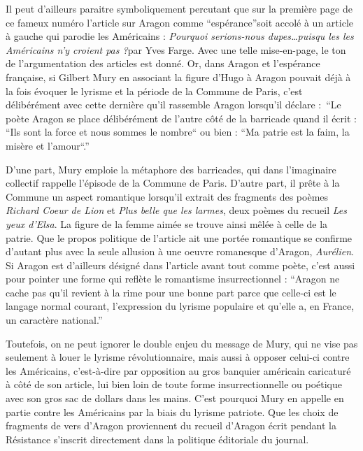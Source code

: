 Il peut d’ailleurs paraitre symboliquement percutant que sur la première page de ce fameux numéro l’article sur Aragon comme \enquote{espérance}soit accolé à un article à gauche qui parodie les Américains : \emph{Pourquoi serions-nous dupes…puisqu les les Américains n’y croient pas ?}par Yves Farge. Avec une telle mise-en-page, le ton de l’argumentation des articles est donné. Or, dans Aragon et l’espérance française, si Gilbert Mury en associant la figure d’Hugo à Aragon pouvait déjà à la fois évoquer le lyrisme et la période de la Commune de Paris, c’est délibérément avec cette dernière qu’il rassemble Aragon lorsqu’il déclare : \enquote{Le poète Aragon se place délibérément de l’autre côté de la barricade quand il écrit : “Ils sont la force et nous sommes le nombre“ ou bien : “Ma patrie est la faim, la misère et l’amour“.}


	D’une part, Mury emploie la métaphore des barricades, qui dans l’imaginaire collectif rappelle l’épisode de la Commune de Paris. D’autre part, il prête à la Commune un aspect romantique lorsqu’il extrait des fragments des poèmes \emph{Richard Coeur de Lion} et \emph{Plus belle que les larmes}, deux poèmes du recueil \emph{Les yeux d’Elsa}. La figure de la femme aimée se trouve ainsi mêlée à  celle de la patrie. Que le propos politique de l’article ait une portée romantique se confirme d’autant plus avec la seule allusion à une oeuvre romanesque d’Aragon, \emph{Aurélien}. Si Aragon est d’ailleurs désigné dans l’article avant tout comme poète, c’est aussi pour pointer une forme qui reflète le romantisme insurrectionnel : \enquote{Aragon ne cache pas qu’il revient à la rime pour une bonne part parce que celle-ci est le langage normal courant, l’expression du lyrisme populaire et qu’elle a, en France, un caractère national.}

	Toutefois, on ne peut ignorer le double enjeu du message de Mury, qui ne vise pas seulement à louer le lyrisme révolutionnaire, mais aussi à opposer celui-ci contre les Américains, c’est-à-dire par opposition au gros banquier américain caricaturé à côté de son article, lui bien loin de toute forme insurrectionnelle ou poétique avec son gros sac de dollars dans les mains. C’est pourquoi Mury en appelle en partie contre les Américains par la biais du lyrisme patriote. Que les choix de fragments de vers d’Aragon proviennent du recueil d’Aragon écrit pendant la Résistance s’inscrit directement dans la politique éditoriale du journal. 


